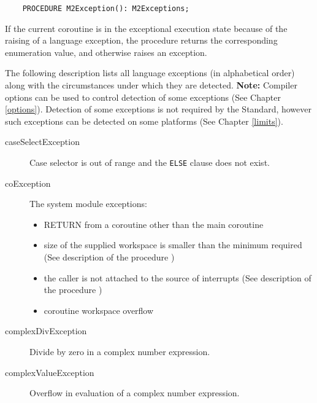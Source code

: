 \verb'    PROCEDURE M2Exception(): M2Exceptions;'

If the current coroutine is in the exceptional execution state
because of the raising of a language exception, the procedure returns the
corresponding enumeration value, and otherwise raises an
exception.

The following description lists all language exceptions
(in alphabetical order) along with the circumstances under which
they are detected. {\bf Note:} Compiler options
can be used to control detection of some exceptions
(See Chapter \ref{options}).
Detection of some exceptions is not required by the Standard, however
such exceptions can be detected on some platforms
(See Chapter \ref{limits}).
\begin{description}
\item[caseSelectException] \mbox{}

         Case selector is out of range and the \verb'ELSE' clause does not exist.

\item[coException] \mbox{}

        The system module 
        exceptions:
        \begin{itemize}
        \item RETURN from a coroutine other than the main coroutine
        \item size of the supplied workspace is smaller than the
              minimum required (See description of the procedure
              )
        \item the caller is not attached to the source of
              interrupts (See description of the procedure
              )
        \item coroutine workspace overflow
        \end{itemize}

\item[complexDivException] \mbox{}

        Divide by zero in a complex number expression.

\item[complexValueException] \mbox{}

        Overflow in evaluation of a complex number expression.


\end{description}
